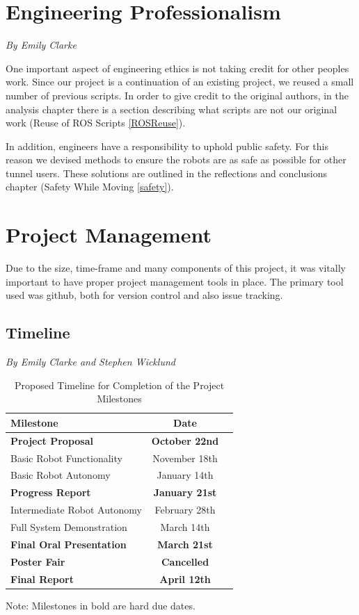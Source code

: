 \documentclass[12pt]{report}
\newcommand{\sectionAuthor}[1]{{\small\vspace{-1em}\textit{#1}}\bigskip\par}
\begin{document}
\section{Engineering Professionalism}
\sectionAuthor{By Emily Clarke}
One important aspect of engineering ethics is not taking credit for other peoples work. Since our project is a continuation of an existing project, we reused a small number of previous scripts. In order to give credit to the original authors, in the analysis chapter there is a section describing what scripts are not our original work (Reuse of ROS Scripts \ref{ROSReuse}).

In addition, engineers have a responsibility to uphold public safety. For this reason we devised methods to ensure the robots are as safe as possible for other tunnel users. These solutions are outlined in the reflections and conclusions chapter (Safety While Moving \ref{safety}).


\section{Project Management}
Due to the size, time-frame and many components of this project, it was vitally important to have proper project management tools in place. The primary tool used was github, both for version control and also issue tracking.
\subsection{Timeline}
\sectionAuthor{By Emily Clarke and Stephen Wicklund}
\label{timeline}
\begin{table}[H]
\centering
\caption{Proposed Timeline for Completion of the Project Milestones}
\centering
\begin{tabular}[t]{lcc}
\toprule
Milestone&Date\\
\midrule
\textbf{Project Proposal}&\textbf{October 22nd}\\
Basic Robot Functionality&November 18th\\
Basic Robot Autonomy&January 14th\\ 
\textbf{Progress Report}&\textbf{January 21st}\\
Intermediate Robot Autonomy&February 28th\\
Full System Demonstration&March 14th\\
\textbf{Final Oral Presentation}&\textbf{March 21st}\\
\textbf{Poster Fair}&\textbf{Cancelled}\\
\textbf{Final Report}&\textbf{April 12th}\\
\bottomrule
\end{tabular}
\begin{tablenotes}
      \small
      \centering
      \item Note: Milestones in bold are hard due dates.
\end{tablenotes}
\end{table}%
\end{document}
